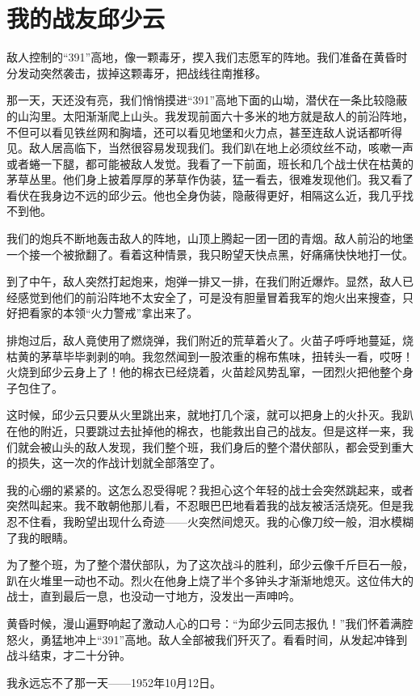 \documentclass[12pt,UTF-8,openany]{ctexbook}
\begin{document}
\chapter{我的战友邱少云}

\begin{Large}
    
    敌人控制的“391”高地，像一颗毒牙，揳入我们志愿军的阵地。我们准备在黄昏时分发动突然袭击，拔掉这颗毒牙，把战线往南推移。
    
    那一天，天还没有亮，我们悄悄摸进“391”高地下面的山坳，潜伏在一条比较隐蔽的山沟里。太阳渐渐爬上山头。我发现前面六十多米的地方就是敌人的前沿阵地，不但可以看见铁丝网和胸墙，还可以看见地堡和火力点，甚至连敌人说话都听得见。敌人居高临下，当然很容易发现我们。我们趴在地上必须纹丝不动，咳嗽一声或者蜷一下腿，都可能被敌人发觉。我看了一下前面，班长和几个战士伏在枯黄的茅草丛里。他们身上披着厚厚的茅草作伪装，猛一看去，很难发现他们。我又看了看伏在我身边不远的邱少云。他也全身伪装，隐蔽得更好，相隔这么近，我几乎找不到他。
    
    我们的炮兵不断地轰击敌人的阵地，山顶上腾起一团一团的青烟。敌人前沿的地堡一个接一个被掀翻了。看着这种情景，我只盼望天快点黑，好痛痛快快地打一仗。
    
    到了中午，敌人突然打起炮来，炮弹一排又一排，在我们附近爆炸。显然，敌人已经感觉到他们的前沿阵地不太安全了，可是没有胆量冒着我军的炮火出来搜查，只好把看家的本领“火力警戒”拿出来了。
    
    排炮过后，敌人竟使用了燃烧弹，我们附近的荒草着火了。火苗子呼呼地蔓延，烧枯黄的茅草毕毕剥剥的响。我忽然闻到一股浓重的棉布焦味，扭转头一看，哎呀！火烧到邱少云身上了！他的棉衣已经烧着，火苗趁风势乱窜，一团烈火把他整个身子包住了。
    
    这时候，邱少云只要从火里跳出来，就地打几个滚，就可以把身上的火扑灭。我趴在他的附近，只要跳过去扯掉他的棉衣，也能救出自己的战友。但是这样一来，我们就会被山头的敌人发现，我们整个班，我们身后的整个潜伏部队，都会受到重大的损失，这一次的作战计划就全部落空了。
    
    我的心绷的紧紧的。这怎么忍受得呢？我担心这个年轻的战士会突然跳起来，或者突然叫起来。我不敢朝他那儿看，不忍眼巴巴地看着我的战友被活活烧死。但是我忍不住看，我盼望出现什么奇迹——火突然间熄灭。我的心像刀绞一般，泪水模糊了我的眼睛。
    
    为了整个班，为了整个潜伏部队，为了这次战斗的胜利，邱少云像千斤巨石一般，趴在火堆里一动也不动。烈火在他身上烧了半个多钟头才渐渐地熄灭。这位伟大的战士，直到最后一息，也没动一寸地方，没发出一声呻吟。
    
    黄昏时候，漫山遍野响起了激动人心的口号：“为邱少云同志报仇！”我们怀着满腔怒火，勇猛地冲上“391”高地。敌人全部被我们歼灭了。看看时间，从发起冲锋到战斗结束，才二十分钟。
    
    我永远忘不了那一天——1952年10月12日。
    
\end{Large}
\end{document}
